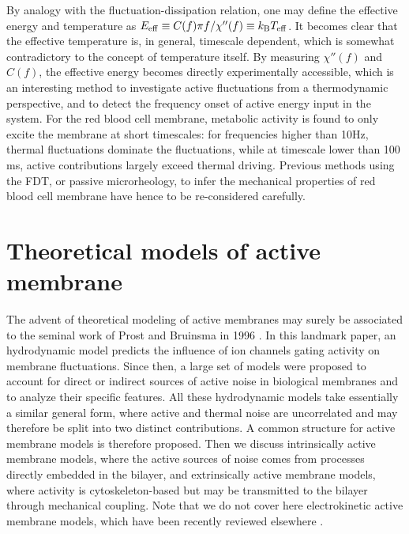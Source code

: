 \documentclass[graybox]{svmult}
\begin{document}
By analogy with the fluctuation-dissipation relation, one may define the effective energy and temperature as $E_{\rm{eff}} \equiv C(f) \pi f / \chi''(f) \equiv k_{\rm{B}}T_{\rm{eff}}$. It becomes clear that the effective temperature is, in general, timescale dependent, which is somewhat contradictory to the concept of temperature itself. By measuring $\chi''(f)$ and $C(f)$, the effective energy becomes directly experimentally accessible, which is an interesting method to investigate active fluctuations from a thermodynamic perspective, and to detect the frequency onset of active energy input in the system. For the red blood cell membrane, metabolic activity is found to only excite the membrane at short timescales: for frequencies higher than 10Hz, thermal fluctuations dominate the fluctuations, while at timescale lower than 100 ms, active contributions largely exceed thermal driving. Previous methods using the FDT, or passive microrheology, to infer the mechanical properties of red blood cell membrane have hence to be re-considered carefully.

\section{Theoretical models of active membrane}

The advent of theoretical modeling of active membranes may surely be associated to the seminal work of Prost and Bruinsma in 1996 \cite{Prost:1996}. In this landmark paper, an hydrodynamic model predicts the influence of ion channels gating activity on membrane fluctuations. Since then, a large set of models were proposed to account for direct or indirect sources of active noise in biological membranes and to analyze their specific features. All these hydrodynamic models take essentially a similar general form, where active and thermal noise are uncorrelated and may therefore be split into two distinct contributions. A common structure for active membrane models is therefore proposed. Then we discuss intrinsically active membrane models, where the active sources of noise comes from processes directly embedded in the bilayer, and extrinsically active membrane models, where activity is cytoskeleton-based but may be transmitted to the bilayer through mechanical coupling. 
Note that we do not cover here electrokinetic active membrane models, which have been recently reviewed elsewhere \cite{Lacoste:2014}. 
\end{document}
